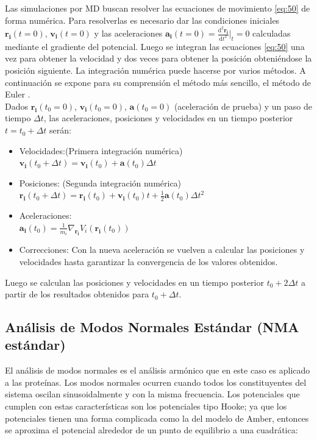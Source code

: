 Las simulaciones por MD buscan resolver las ecuaciones de movimiento \eqref{eq:50} de forma num\'{e}rica. Para resolverlas es necesario dar las condiciones iniciales $\mathbf{r_i}(t=0)$, $\mathbf{v_i}(t=0)$ y las aceleraciones $\mathbf{a_i}(t=0)=\frac{\mathrm{d}^2\mathbf{r_i}}{\mathrm{d}t^2}\bigg|_t=0$ calculadas mediante el gradiente del potencial. Luego se integran las ecuaciones \ref{eq:50} una vez para obtener la velocidad y dos veces para obtener la posici\'{o}n obteni\'{e}ndose la posici\'{o}n siguiente. La integraci\'{o}n num\'{e}rica puede hacerse por varios m\'{e}todos. A continuaci\'{o}n se expone para su comprensi\'{o}n el m\'{e}todo m\'{a}s sencillo, el m\'{e}todo de Euler \cite{Stote1999TheorySimulations}.\\

Dados $\mathbf{r_i}(t_0=0)$, $\mathbf{v_i}(t_0=0)$, $\mathbf{a}(t_0=0)$ (aceleraci\'{o}n de prueba) y un paso de tiempo $\Delta t$, las aceleraciones, posiciones y velocidades en un tiempo posterior $t=t_0+\Delta t$ ser\'{a}n:
\begin{itemize}
\item Velocidades:(Primera integraci\'{o}n num\'{e}rica)\\ $\mathbf{v_i}(t_0+\Delta t)=\mathbf{v_i}(t_0)+\mathbf{a}(t_0)\Delta t$
\item Posiciones: (Segunda integraci\'{o}n num\'{e}rica)\\ $\mathbf{r_i}(t_0+\Delta t)=\mathbf{r_i}(t_0)+\mathbf{v_i}(t_0)t+\frac{1}{2}\mathbf{a}(t_0)\Delta t^2$
\item Aceleraciones:\\ $\mathbf{a_i}(t_0)=\frac{1}{m_i}\nabla_\mathbf{r_i} V_i(\mathbf{r_i}(t_0))$
\item Correcciones: Con la nueva aceleraci\'{o}n se vuelven a calcular las posiciones y velocidades hasta garantizar la convergencia de los valores obtenidos.
\end{itemize}
Luego se calculan las posiciones y velocidades en un tiempo posterior $t_0+2\Delta t$ a partir de los resultados obtenidos para $t_0+\Delta t$.
\subsection{An\'{a}lisis de Modos Normales Est\'{a}ndar (NMA est\'{a}ndar)}\label{NMAsta}

El an\'{a}lisis de modos normales es el an\'{a}lisis arm\'{o}nico que en este caso es aplicado a las prote\'{i}nas. Los modos normales ocurren cuando todos los constituyentes del sistema oscilan sinusoidalmente y con la misma frecuencia. Los potenciales que cumplen con estas caracter\'{i}sticas son los potenciales tipo Hooke; ya que los potenciales tienen una forma complicada como la del modelo de Amber, entonces se aproxima el potencial alrededor de un punto de equilibrio a una cuadr\'{a}tica:

